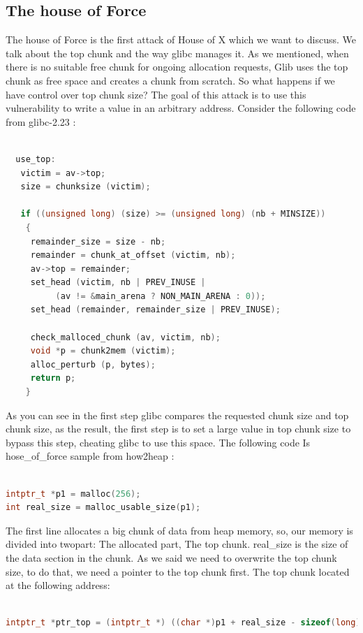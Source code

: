 \documentclass{masterthesis}
\newcommand*\libc{glibc}
\begin{document}
\subsection{The house of Force}
The house of Force is the first attack of House of X which we want to discuss. We talk about the top chunk and the way \libc{} manages it. As we mentioned, when there is no suitable free chunk for ongoing allocation requests, Glib uses the top chunk as free space and creates a chunk from scratch. So what happens if we have control over top chunk size? The goal of this attack is to use this vulnerability to write a value in an arbitrary address. Consider the following code from \libc{-2.23} :
\begin{lstlisting}[language=c,frame=tlrb]

  use_top:
   victim = av->top;
   size = chunksize (victim);

   if ((unsigned long) (size) >= (unsigned long) (nb + MINSIZE))
    {
     remainder_size = size - nb;
     remainder = chunk_at_offset (victim, nb);
     av->top = remainder;
     set_head (victim, nb | PREV_INUSE |
          (av != &main_arena ? NON_MAIN_ARENA : 0));
     set_head (remainder, remainder_size | PREV_INUSE);

     check_malloced_chunk (av, victim, nb);
     void *p = chunk2mem (victim);
     alloc_perturb (p, bytes);
     return p;
    }
\end{lstlisting}
As you can see in the first step \libc{} compares the requested chunk size and top chunk size, as the result, the first step is to set a large value in top chunk size to bypass this step, cheating \libc{} to use this space. The following code Is hose\_of\_force sample from how2heap :
\begin{lstlisting}[language=c,frame=tlrb]

intptr_t *p1 = malloc(256);
int real_size = malloc_usable_size(p1);
\end{lstlisting}
The first line allocates a big chunk of data from heap memory, so, our memory is divided into two\-part: The allocated part, The top chunk. real\_size is the size of the data section in the chunk. As we said we need to overwrite the top chunk size, to do that, we need a pointer to the top chunk first. The top chunk located at the following address: 
\begin{lstlisting}[language=c,frame=tlrb]

intptr_t *ptr_top = (intptr_t *) ((char *)p1 + real_size - sizeof(long));
\end{lstlisting}
\end{document}
